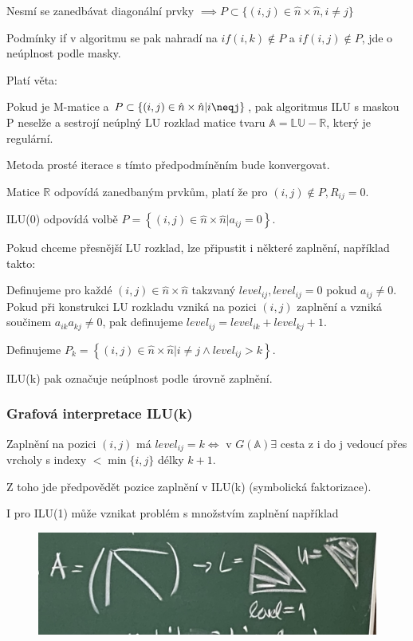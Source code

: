\documentclass[../main.tex]{subfiles}
\begin{document}
Nesmí se zanedbávat diagonální prvky $\implies P \subset \{(i,j)\in \hat{n} \times \hat{n}, i\neq j \}$

Podmínky if v algoritmu se pak nahradí na $if(i,k)\notin P$ a $if(i,j)\notin P$, jde o neúplnost podle masky.

Platí věta:
\begin{theorem}
    Pokud \matA je M-matice a $P\subset\{(i,j)\in \hat{n} \times \hat{n}| i\neqj\}$, pak algoritmus ILU s maskou P neselže
    a sestrojí neúplný LU rozklad matice \matA tvaru $\mathbb{A} = \mathbb{L} \mathbb{U} - \mathbb{R}$, který je regulární.
    
    Metoda prosté iterace s tímto předpodmíněním bude konvergovat.
\end{theorem}

Matice $\mathbb{R}$ odpovídá zanedbaným prvkům, platí že pro $(i,j)\notin P, R_{ij} = 0$.

ILU(0) odpovídá volbě $  P = \left\{ (i,j) \in \hat{n} \times \hat{n} | a_{ij} = 0 \right\}$.

Pokud chceme přesnější LU rozklad, lze připustit i některé zaplnění, například takto:

Definujeme pro každé $(i,j)\in \hat{n} \times \hat{n} $ takzvaný $level_{ij}, level_{ij}=0$ pokud $a_{ij} \neq 0$.
Pokud při konstrukci LU rozkladu vzniká na pozici $(i,j)$ zaplnění a vzniká součinem $a_{ik} a_{kj} \neq 0$, pak definujeme
$level_{ij} = level_{ik} + level_{kj} + 1$. 

Definujeme $  P_k = \left\{ (i,j) \in \hat{n} \times \hat{n} | i\neq j \wedge level_{ij} > k \right\}$.

ILU(k) pak označuje neúplnost podle úrovně zaplnění. 


\subsubsection{Grafová interpretace ILU(k)}

Zaplnění na pozici $(i,j)$ má $level_{ij} = k \Leftrightarrow$ v $G(\mathbb{A}) \exists$ cesta z i do j vedoucí přes vrcholy s indexy $< \min\{i,j\}$ délky $k+1$.

Z toho jde předpovědět pozice zaplnění v ILU(k) (symbolická faktorizace).

\begin{remark}
    I pro ILU(1) může vznikat problém s množstvím zaplnění například


    \begin{figure}[H]
        \centering
        \includegraphics{images/30-11-ILU1.jpg}
    \end{figure}

\end{remark}
\end{document}
